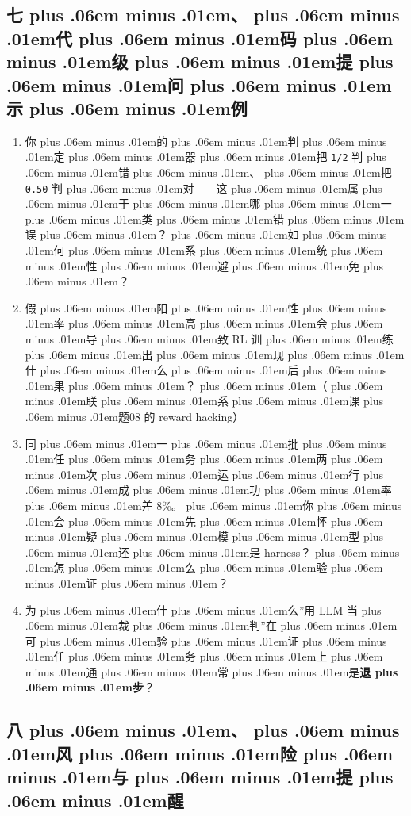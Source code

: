 \documentclass[
]{article}
\newcommand{\passthrough}[1]{#1}
\providecommand{\tightlist}{%
  \setlength{\itemsep}{0pt}\setlength{\parskip}{0pt}}
\def\zh#1{{\zhfont #1}}
\def\zhglue{\hskip0pt plus .06em minus .01em}
\begin{document}
\subsection{\zh{七\zhglue 、\zhglue 代\zhglue 码\zhglue 级\zhglue 提\zhglue 问\zhglue 示\zhglue 例}}\label{ux4e03ux4ee3ux7801ux7ea7ux63d0ux95eeux793aux4f8b-6}

\begin{enumerate}
\def\labelenumi{\arabic{enumi}.}
\tightlist
\item
  \zh{你\zhglue 的\zhglue 判\zhglue 定\zhglue 器\zhglue 把} \passthrough{\lstinline!1/2!} \zh{判\zhglue 错\zhglue 、\zhglue 把} \passthrough{\lstinline!0.50!} \zh{判\zhglue 对}------\zh{这\zhglue 属\zhglue 于\zhglue 哪\zhglue 一\zhglue 类\zhglue 错\zhglue 误\zhglue ？\zhglue 如\zhglue 何\zhglue 系\zhglue 统\zhglue 性\zhglue 避\zhglue 免\zhglue ？}
\item
  \zh{假\zhglue 阳\zhglue 性\zhglue 率\zhglue 高\zhglue 会\zhglue 导\zhglue 致} RL \zh{训\zhglue 练\zhglue 出\zhglue 现\zhglue 什\zhglue 么\zhglue 后\zhglue 果\zhglue ？\zhglue （\zhglue 联\zhglue 系\zhglue 课\zhglue 题}08 \zh{的} reward hacking\zh{）}
\item
  \zh{同\zhglue 一\zhglue 批\zhglue 任\zhglue 务\zhglue 两\zhglue 次\zhglue 运\zhglue 行\zhglue 成\zhglue 功\zhglue 率\zhglue 差} 8\%\zh{。\zhglue 你\zhglue 会\zhglue 先\zhglue 怀\zhglue 疑\zhglue 模\zhglue 型\zhglue 还\zhglue 是} harness\zh{？\zhglue 怎\zhglue 么\zhglue 验\zhglue 证\zhglue ？}
\item
  \zh{为\zhglue 什\zhglue 么}''\zh{用} LLM \zh{当\zhglue 裁\zhglue 判}''\zh{在\zhglue 可\zhglue 验\zhglue 证\zhglue 任\zhglue 务\zhglue 上\zhglue 通\zhglue 常\zhglue 是}\textbf{\zh{退\zhglue 步}}\zh{？}
\end{enumerate}

\subsection{\zh{八\zhglue 、\zhglue 风\zhglue 险\zhglue 与\zhglue 提\zhglue 醒}}\label{ux516bux98ceux9669ux4e0eux63d0ux9192-7}
\end{document}
